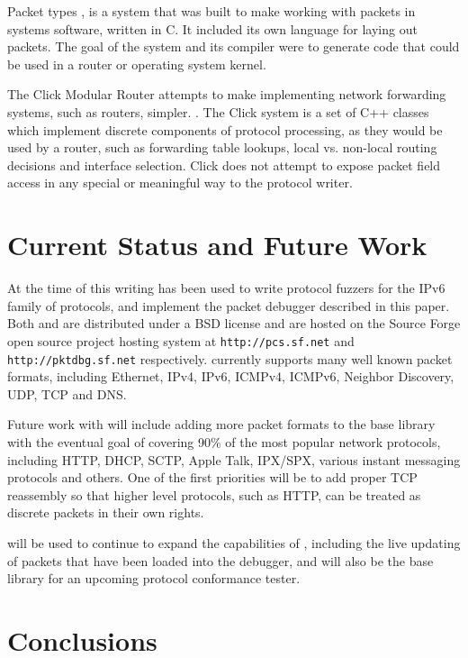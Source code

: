 \documentclass{sig-alternate-10pt}
\begin{document}
Packet types \cite{mccann:sigcomm00}, is a system that was built to
make working with packets in systems software, written in C.  It
included its own language for laying out packets.  The goal of the
system and its compiler were to generate code that could be used in a
router or operating system kernel.

The Click Modular Router \cite{kohler:tocs00} attempts to make
implementing network forwarding systems, such as routers, simpler. .
The Click system is a set of C++ classes which implement discrete
components of protocol processing, as they would be used by a router,
such as forwarding table lookups, local vs. non-local routing
decisions and interface selection.  Click does not attempt to expose
packet field access in any special or meaningful way to the protocol
writer.

\section{Current Status and Future Work}
\label{sec:future-work}

At the time of this writing  has been used to write
protocol fuzzers for the IPv6 family of protocols, and implement the
packet debugger described in this paper.  Both  and
 are distributed under a BSD license and are hosted on
the Source Forge open source project hosting system at
\verb|http://pcs.sf.net| and \verb|http://pktdbg.sf.net| respectively.
 currently supports many well known packet formats,
including Ethernet, IPv4, IPv6, ICMPv4, ICMPv6, Neighbor Discovery,
UDP, TCP and DNS.

Future work with  will include adding more packet formats
to the base library with the eventual goal of covering 90\% of the
most popular network protocols, including HTTP, DHCP, SCTP, Apple
Talk, IPX/SPX, various instant messaging protocols and others.  One of
the first priorities will be to add proper TCP reassembly so that
higher level protocols, such as HTTP, can be treated as discrete
packets in their own rights.

 will be used to continue to expand the capabilities of
, including the live updating of packets that have been
loaded into the debugger, and will also be the base library for an
upcoming protocol conformance tester.

\section{Conclusions}
\label{sec:conclusions}
\end{document}

